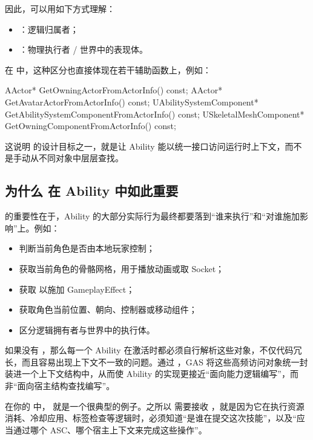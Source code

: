 因此，可以用如下方式理解：

\begin{itemize}
	\item {}：逻辑归属者；
	\item {}：物理执行者 / 世界中的表现体。
\end{itemize}

在  中，这种区分也直接体现在若干辅助函数上，例如：

\begin{code}
	AActor* GetOwningActorFromActorInfo() const;
	AActor* GetAvatarActorFromActorInfo() const;
	UAbilitySystemComponent* GetAbilitySystemComponentFromActorInfo() const;
	USkeletalMeshComponent* GetOwningComponentFromActorInfo() const;
\end{code}

这说明  的设计目标之一，就是让 Ability 能以统一接口访问运行时上下文，而不是手动从不同对象中层层查找。

\subsection{为什么  在 Ability 中如此重要}
 的重要性在于，Ability 的大部分实际行为最终都要落到“谁来执行”和“对谁施加影响”上。例如：

\begin{itemize}
	\item 判断当前角色是否由本地玩家控制；
	\item 获取当前角色的骨骼网格，用于播放动画或取 Socket；
	\item 获取  以施加 GameplayEffect；
	\item 获取角色当前位置、朝向、控制器或移动组件；
	\item 区分逻辑拥有者与世界中的执行体。
\end{itemize}

如果没有 ，那么每一个 Ability 在激活时都必须自行解析这些对象，不仅代码冗长，而且容易出现上下文不一致的问题。通过 ，GAS 将这些高频访问对象统一封装进一个上下文结构中，从而使 Ability 的实现更接近“面向能力逻辑编写”，而非“面向宿主结构查找编写”。

在你的  中， 就是一个很典型的例子。之所以  需要接收 ，就是因为它在执行资源消耗、冷却应用、标签检查等逻辑时，必须知道“是谁在提交这次技能”，以及“应当通过哪个 ASC、哪个宿主上下文来完成这些操作”。

